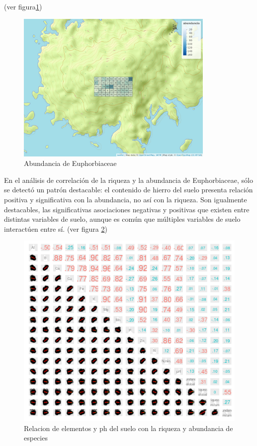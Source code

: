 \documentclass[11pt,]{article}
\begin{document}
(ver figura\ref{fig:cuadro_abundancia_de_mi_familia})

\begin{figure}
\centering
\includegraphics[width=0.85000\textwidth]{mapa_cuadros_abun_mi_familia.png}
\caption{\label{fig:cuadro_abundancia_de_mi_familia}Abundancia de
Euphorbiaceae}
\end{figure}

En el análisis de correlación de la riqueza y la abundancia de
Euphorbiaceae, sólo se detectó un patrón destacable: el contenido de
hierro del suelo presenta relación positiva y significativa con la
abundancia, no así con la riqueza. Son igualmente destacables, las
significativas asociaciones negativas y positivas que existen entre
distintas variables de suelo, aunque es común que múltiples variables de
suelo interactúen entre sí. (ver figura \ref{fig:suelo_ph_abun_riqu})

\begin{figure}
\centering
\includegraphics{suelo_ph_abun_riqu.png}
\caption{\label{fig:suelo_ph_abun_riqu}Relacion de elementos y ph del
suelo con la riqueza y abundancia de especies}
\end{figure}
\end{document}
